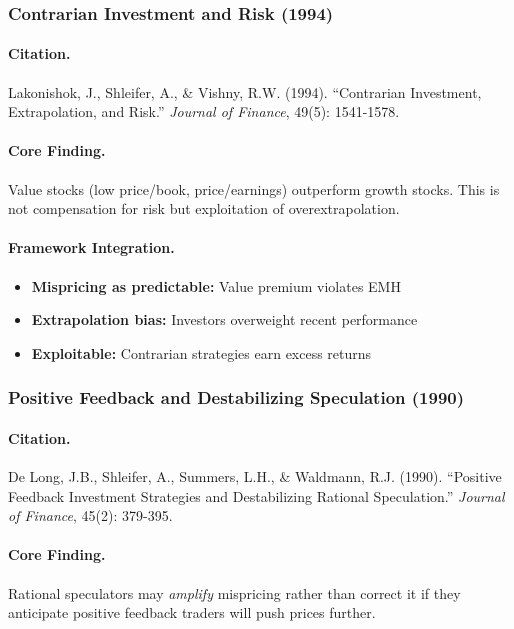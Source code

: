\subsubsection{Contrarian Investment and Risk (1994)}

\paragraph{Citation.}
Lakonishok, J., Shleifer, A., \& Vishny, R.W. (1994).
``Contrarian Investment, Extrapolation, and Risk.''
\emph{Journal of Finance}, 49(5): 1541-1578.

\paragraph{Core Finding.}
Value stocks (low price/book, price/earnings) outperform growth stocks.
This is not compensation for risk but exploitation of overextrapolation.

\paragraph{Framework Integration.}
\begin{itemize}
  \item \textbf{Mispricing as predictable:} Value premium violates EMH
  \item \textbf{Extrapolation bias:} Investors overweight recent performance
  \item \textbf{Exploitable:} Contrarian strategies earn excess returns
\end{itemize}

\subsubsection{Positive Feedback and Destabilizing Speculation (1990)}

\paragraph{Citation.}
De Long, J.B., Shleifer, A., Summers, L.H., \& Waldmann, R.J. (1990).
``Positive Feedback Investment Strategies and Destabilizing Rational Speculation.''
\emph{Journal of Finance}, 45(2): 379-395.

\paragraph{Core Finding.}
Rational speculators may \emph{amplify} mispricing rather than correct it
if they anticipate positive feedback traders will push prices further.

